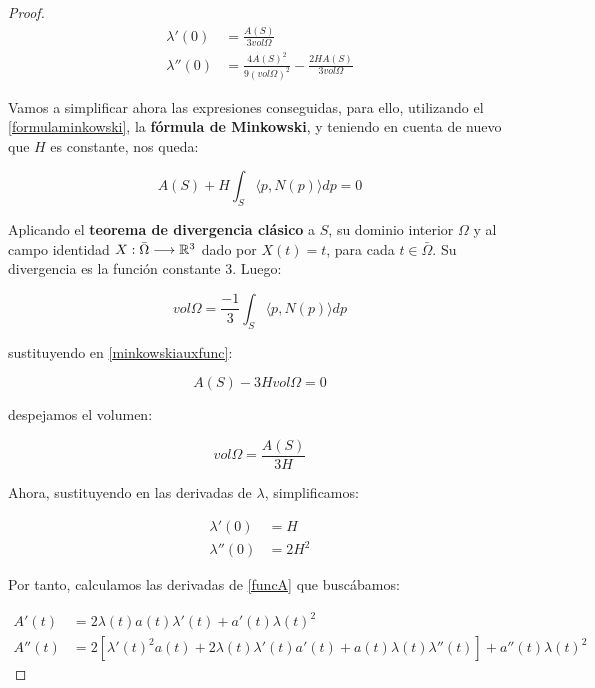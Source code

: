 \begin{proof}
\begin{align*}
    \lambda'(0) &= \frac{A(S)}{3 vol \Omega} \\
    \lambda''(0) &= \frac{4 A(S)^2}{9 (vol\Omega)^{2}} - \frac{2HA(S)}{3 vol\Omega} 
\end{align*}

Vamos a simplificar ahora las expresiones conseguidas, para ello, utilizando el \autoref{formulaminkowski}, la \textbf{fórmula de Minkowski}, y teniendo en cuenta de nuevo que $H$ es constante, nos queda:

\begin{equation}\label{minkowskiauxfunc}
    A(S) + H\int_S \langle p, N(p) \rangle dp = 0
\end{equation}

Aplicando el \textbf{teorema de divergencia clásico} a $S$, su dominio interior $\Omega$ y al campo identidad $X: \bar{\Omega} \longrightarrow \mathbb{R}^3$ dado por $X(t) = t$, para cada $t \in \bar{\Omega}$. Su divergencia es la función constante 3. Luego:

\begin{equation*}
    vol \Omega = \frac{-1}{3}\int_S \langle p, N(p) \rangle dp
\end{equation*}

sustituyendo en \autoref{minkowskiauxfunc}:

\begin{equation*}
    A(S) - 3Hvol \Omega = 0
\end{equation*}

despejamos el volumen:

\begin{equation*}
    vol \Omega = \frac{A(S)}{3H}
\end{equation*}

Ahora, sustituyendo en las derivadas de $\lambda$, simplificamos:

\begin{align*}
    \lambda'(0) &= H \\
    \lambda''(0) &= 2H^2
\end{align*}

Por tanto, calculamos las derivadas de \autoref{funcA} que buscábamos:

\begin{align*}
    A'(t) &= 2\lambda(t)a(t)\lambda'(t) + a'(t)\lambda(t)^2 \\
    A''(t) &= 2\left [ \lambda'(t)^2a(t) + 2\lambda(t)\lambda'(t)a'(t) + a(t)\lambda(t)\lambda''(t) \right] + a''(t)\lambda(t)^2
\end{align*}


\end{proof}
